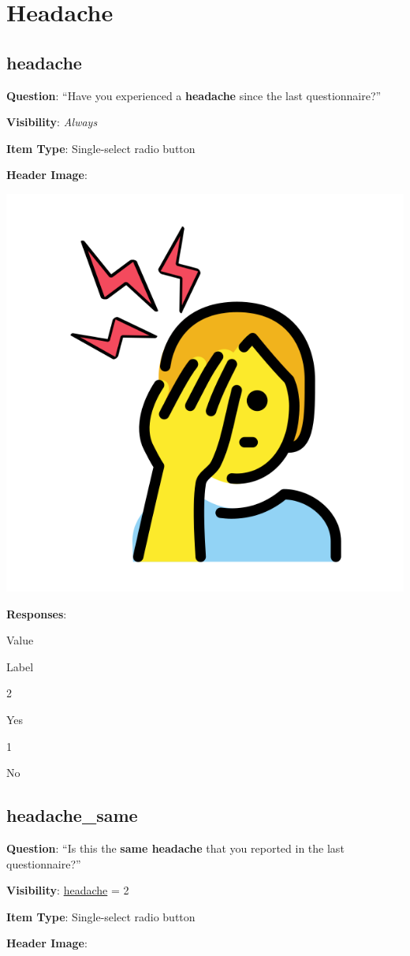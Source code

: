 \documentclass[]{book}
\begin{document}
\hypertarget{headache_section}{%
\chapter{Headache}\label{headache_section}}

\hypertarget{headache}{%
\section{headache}\label{headache}}

\textbf{Question}: ``Have you experienced a \textbf{headache} since the last questionnaire?''

\textbf{Visibility}: \emph{Always}

\textbf{Item Type}: Single-select radio button

\textbf{Header Image}:

\begin{flushleft}\includegraphics[width=0.33\linewidth]{downloadFigs4latex_NIMH_Applet_Codebook/headache_headerImg} \end{flushleft}

\textbf{Responses}:

Value

Label

2

Yes

1

No

\hypertarget{headache_same}{%
\section{headache\_same}\label{headache_same}}

\textbf{Question}: ``Is this the \textbf{same headache} that you reported in the last questionnaire?''

\textbf{Visibility}: \protect\hyperlink{headache}{headache} = 2

\textbf{Item Type}: Single-select radio button

\textbf{Header Image}:
\end{document}
